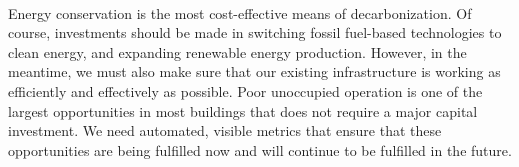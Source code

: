 \documentclass[a4paper]{article}
\begin{document}
\paragraph{}
Energy conservation is the most cost-effective means of decarbonization. Of course, investments should be made in switching fossil fuel-based technologies to clean energy, and expanding renewable energy production. However, in the meantime, we must also make sure that our existing infrastructure is working as efficiently and effectively as possible. Poor unoccupied operation is one of the largest opportunities in most buildings that does not require a major capital investment. We need automated, visible metrics that ensure that these opportunities are being fulfilled now and will continue to be fulfilled in the future.
\end{document}
